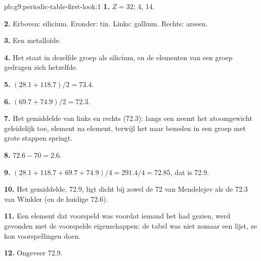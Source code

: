 \begin{solution}{pb:g9:periodic-table-first-look:1}
\textbf{1.} $Z = 32$;  4,  14.

\textbf{2.} Erboven: silicium. Eronder: tin. Links: gallium. Rechts:
arseen.

\textbf{3.} Een metalloïde.

\textbf{4.} Het staat in dezelfde groep als silicium, en de elementen van
een groep gedragen zich hetzelfde.

\textbf{5.} $(28.1 + 118.7)/2 = 73.4$.

\textbf{6.} $(69.7 + 74.9)/2 = 72.3$.

\textbf{7.} Het gemiddelde van links en rechts (72.3): langs een 
neemt het atoomgewicht geleidelijk toe, element na element, terwijl het
naar beneden in een groep met grote stappen springt.

\textbf{8.} $72.6 - 70 = 2.6$.

\textbf{9.} $(28.1 + 118.7 + 69.7 + 74.9)/4 = 291.4/4 = 72.85$, dat is
72.9.

\textbf{10.} Het gemiddelde, 72.9, ligt dicht bij zowel de 72 van
Mendelejev als de 72.3 van Winkler (en de huidige 72.6).

\textbf{11.} Een element dat voorspeld was voordat iemand het had gezien,
werd gevonden met de voorspelde eigenschappen: de tabel was niet zomaar
een lijst, ze kon voorspellingen doen.

\textbf{12.} Ongeveer 72.9.
\end{solution}
